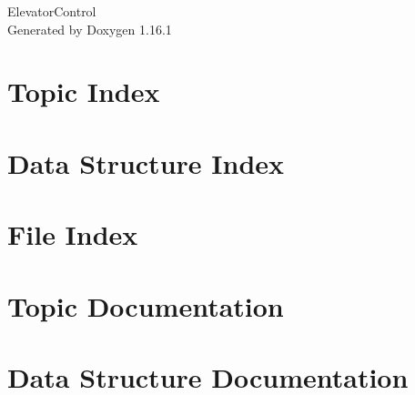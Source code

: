 \documentclass[twoside]{book}
\newcommand{\+}{\discretionary{\mbox{\scriptsize$\hookleftarrow$}}{}{}}
\newcommand{\clearemptydoublepage}{%
    \newpage{\pagestyle{empty}\cleardoublepage}%
  }
\begin{document}
  \raggedbottom
    \hypersetup{pageanchor=false,
                bookmarksnumbered=true,
                pdfencoding=unicode
               }
  \begin{titlepage}
  \vspace*{7cm}
  \begin{center}%
  {\Large Elevator\+Control}\\
  \vspace*{1cm}
  {\large Generated by Doxygen 1.16.1}\\
  \end{center}
  \end{titlepage}
  \clearemptydoublepage
  \tableofcontents
  \clearemptydoublepage
  \hypersetup{pageanchor=true}
\chapter{Topic Index}

\chapter{Data Structure Index}

\chapter{File Index}

\chapter{Topic Documentation}

\chapter{Data Structure Documentation}







\end{document}
